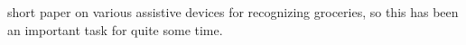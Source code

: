 

\cite{lanigan2006trinetra} short paper on various assistive devices for recognizing groceries, so this has been an important task for quite some time. 

